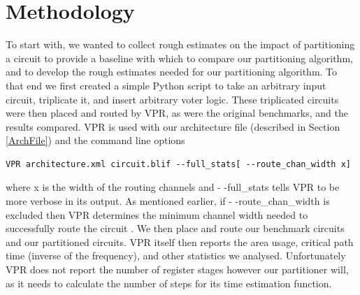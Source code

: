 \documentclass[12pt,final,oneside]{dwThesis} %
\begin{document}
\section{Methodology}\label{BenchmarkMethod}
To start with, we wanted to collect rough estimates on the impact of partitioning a circuit to provide a baseline with which to compare our partitioning algorithm, and to develop the rough estimates needed for our partitioning algorithm. To that end we first created a simple Python script to take an arbitrary input circuit, triplicate it, and insert arbitrary voter logic. These triplicated circuits were then placed and routed by \ac{VPR}, as were the original benchmarks, and the results compared.
\newpage
{}
\ac{VPR} is used with our architecture file (described in Section \ref{ArchFile}) and the command line options
\begin{lstlisting}
VPR architecture.xml circuit.blif --full_stats[ --route_chan_width x]
\end{lstlisting} where x is the width of the routing channels and - -full\_stats tells \ac{VPR} to be more verbose in its output.
As mentioned earlier, if - -route\_chan\_width is excluded then \ac{VPR} determines the minimum channel width needed to successfully route the circuit \cite{VPRManual}. We then place and route our benchmark circuits and our partitioned circuits. \ac{VPR} itself then reports the area usage, critical path time (inverse of the frequency), and other statistics we analysed. Unfortunately \ac{VPR} does not report the number of register stages however our partitioner will, as it needs to calculate the number of steps for its time estimation function.
\end{document}

